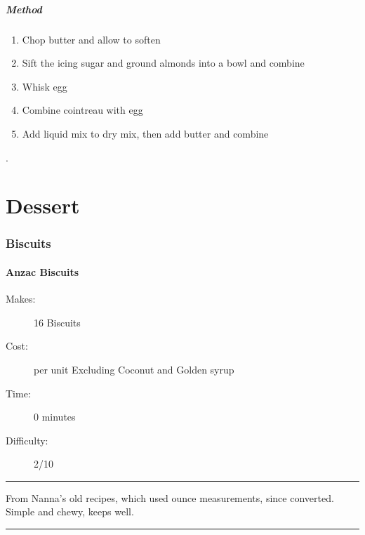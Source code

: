 \documentclass[]{article}
\begin{document}
\subsubsection*{\Large Method}
\begin{enumerate}[font=\huge\color{accent}]
	\item Chop butter and allow to soften
	\item Sift the icing sugar and ground almonds into a bowl and combine
	\item Whisk egg
	\item Combine cointreau with egg
	\item Add liquid mix to dry mix, then add butter and combine
\end{enumerate}
\newpage

\newpage
\color{white}.\color{black}
\vspace{5cm}
\part{\Huge Dessert}
\newpage
{}
\section*{\center\Huge\color{accent}Biscuits}
\label{cat:Biscuits}
\label{rec:Anzac Biscuits}
\subsection*{\center\huge Anzac Biscuits}
\begin{description}
\item[Makes:] 16 Biscuits
\item[Cost:]  per unit Excluding Coconut and Golden syrup
\item[Time:] 0 minutes
\item[Difficulty:] 2/10
\end{description}
\vspace{0.2cm}\hrule\vspace{0.5cm}
\begin{adjustwidth}{0.5 cm}{0.5 cm}

From Nanna’s old recipes, which used ounce measurements, since converted. Simple and chewy, keeps well.  \hfill\color{accent}{\Large\faVimeoSquare\hspace{0.1cm}\faTruck\hspace{0.1cm}}\color{black}

\end{adjustwidth}
\vspace{0.5cm}\hrule
\end{document}
